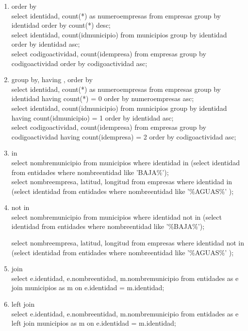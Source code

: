 \documentclass[10pt]{article}         %
\begin{document}
\begin{enumerate}
\item order by \\
 select identidad, count(*) as numeroempresas from empresas group by identidad order by count(*) desc; \\
 select identidad, count(idmunicipio) from municipios group by identidad order by identidad asc; \\
 select codigoactividad, count(idempresa) from empresas group by codigoactividad order by codigoactividad asc; 

\item group by, having , order by \\
 select identidad, count(*) as numeroempresas from empresas group by identidad having count(*) = 0 order by numeroempresas asc; \\
 select identidad, count(idmunicipio) from municipios group by identidad having count(idmunicipio) = 1 order by identidad asc; \\
 select codigoactividad, count(idempresa) from empresas group by codigoactividad having count(idempresa) = 2  order by codigoactividad asc; 

\item  in \\
	select nombremunicipio from municipios where identidad in (select identidad from entidades where nombreentidad like 'BAJA\%'); \\

select nombreempresa, latitud, longitud from empresas where identidad in (select identidad from entidades where nombreentidad like '\%AGUAS\%' );

\item not in \\
    select nombremunicipio from municipios where identidad not in (select identidad from entidades 
where nombreentidad like '\%BAJA\%');

select nombreempresa, latitud, longitud from empresas where identidad not in (select identidad from entidades where nombreentidad like '\%AGUAS\%' );

\item join \\

  select e.identidad, e.nombreentidad, m.nombremunicipio from entidades as e join municipios as m on e.identidad = m.identidad;

\item left join \\
select e.identidad, e.nombreentidad, m.nombremunicipio from entidades as e left join municipios as m on e.identidad = m.identidad;


\end{enumerate}
\end{document}
